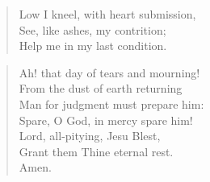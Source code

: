 \begin{quote}

\smallskip
Low I kneel, with heart submission,\\
See, like ashes, my contrition;\\
Help me in my last condition.
\end{quote}

\begin{quote}

\smallskip
Ah! that day of tears and mourning!\\
From the dust of earth returning\\
Man for judgment must prepare him:\\
Spare, O God, in mercy spare him!\\
Lord, all-pitying, Jesu Blest,\\
Grant them Thine eternal rest.\\
Amen.
\end{quote}
